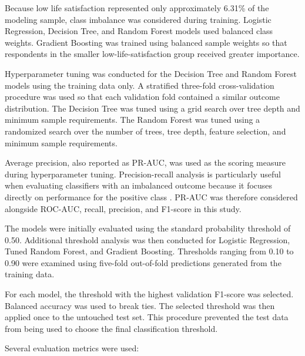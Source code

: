 \documentclass[12pt]{article}
\begin{document}
Because low life satisfaction represented only approximately 6.31\% of the modeling sample, class imbalance was considered during training. Logistic Regression, Decision Tree, and Random Forest models used balanced class weights. Gradient Boosting was trained using balanced sample weights so that respondents in the smaller low-life-satisfaction group received greater importance.

Hyperparameter tuning was conducted for the Decision Tree and Random Forest models using the training data only. A stratified three-fold cross-validation procedure was used so that each validation fold contained a similar outcome distribution. The Decision Tree was tuned using a grid search over tree depth and minimum sample requirements. The Random Forest was tuned using a randomized search over the number of trees, tree depth, feature selection, and minimum sample requirements.

Average precision, also reported as PR-AUC, was used as the scoring
measure during hyperparameter tuning. Precision-recall analysis is
particularly useful when evaluating classifiers with an imbalanced
outcome because it focuses directly on performance for the positive
class \citep{saito2015}. PR-AUC was therefore considered alongside
ROC-AUC, recall, precision, and F1-score in this study.

The models were initially evaluated using the standard probability threshold of 0.50. Additional threshold analysis was then conducted for Logistic Regression, Tuned Random Forest, and Gradient Boosting. Thresholds ranging from 0.10 to 0.90 were examined using five-fold out-of-fold predictions generated from the training data.

For each model, the threshold with the highest validation F1-score was selected. Balanced accuracy was used to break ties. The selected threshold was then applied once to the untouched test set. This procedure prevented the test data from being used to choose the final classification threshold.

Several evaluation metrics were used:
\end{document}
